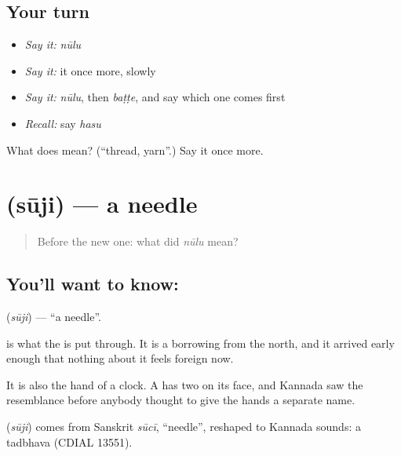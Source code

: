 \subsection*{Your turn}
\begin{itemize}
\raggedright
  \item \emph{Say it:} \emph{nūlu}
  \item \emph{Say it:} it once more, slowly
  \item \emph{Say it:} \emph{nūlu}, then \emph{baṭṭe}, and say which one comes first
  \item \emph{Recall:} say \emph{hasu}
\end{itemize}

\begin{tcolorbox}[breakable,colback=teal!4,colframe=teal!35!black,title={Before you move on}]
What does  mean? (\textquotedblleft{}thread, yarn\textquotedblright{}.) Say it once more.
\end{tcolorbox}
\section[\texorpdfstring{\kn{ಸೂಜಿ} (sūji)}{ಸೂಜಿ (sūji)}]{ (sūji) — a needle}

\label{lesson:KA-C62-needle}



\begin{quote}
Before the new one: what did \emph{nūlu} mean?
\end{quote}

\subsection*{You'll want to know: }
\textbf{} (\emph{sūji}) — \textquotedblleft{}a needle\textquotedblright{}.

 is what the  is put through. It is a borrowing from the north, and it arrived early enough that nothing about it feels foreign now.

It is also the hand of a clock. A  has two  on its face, and Kannada saw the resemblance before anybody thought to give the hands a separate name.

\begin{cousinweb}
\textbf{} (\emph{sūji}) comes from Sanskrit \emph{sūcī}, \textquotedblleft{}needle\textquotedblright{}, reshaped to Kannada sounds: a tadbhava (CDIAL 13551).
\end{cousinweb}

